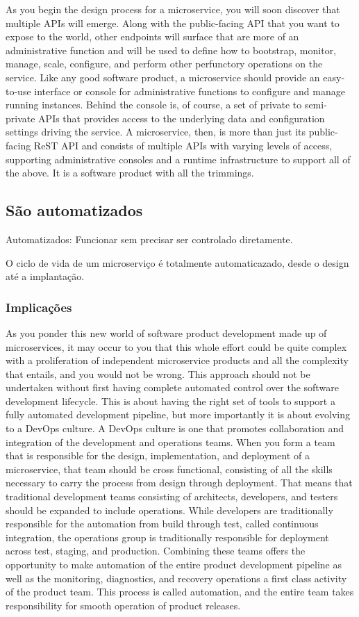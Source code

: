 As you begin the design process for a microservice, you will soon discover that multiple APIs will emerge. Along with the public-facing API that you want to expose to the world, other endpoints will surface that are more of an administrative function and will be used to define how to bootstrap, monitor, manage, scale, configure, and perform other perfunctory operations on the service. Like any good software product, a microservice should provide an easy-to-use interface or console for administrative functions to configure and manage running instances. Behind the console is, of course, a set of private to semi-private APIs that provides access to the underlying data and configuration settings driving the service. A microservice, then, is more than just its public-facing ReST API and consists of multiple APIs with varying levels of access, supporting administrative consoles and a runtime infrastructure to support all of the above. It is a software product with all the trimmings.

\subsection {São automatizados}

Automatizados: Funcionar sem precisar ser controlado diretamente.

O ciclo de vida de um microserviço é totalmente automaticazado, desde o design até a implantação.

\subsubsection*{Implicações}

As you ponder this new world of software product development made up of microservices, it may occur to you that this whole effort could be quite complex with a proliferation of independent microservice products and all the complexity that entails, and you would not be wrong. This approach should not be undertaken without first having complete automated control over the software development lifecycle. This is about having the right set of tools to support a fully automated development pipeline, but more importantly it is about evolving to a DevOps culture. A DevOps culture is one that promotes collaboration and integration of the development and operations teams. When you form a team that is responsible for the design, implementation, and deployment of a microservice, that team should be cross functional, consisting of all the skills necessary to carry the process from design through deployment. That means that traditional development teams consisting of architects, developers, and testers should be expanded to include operations. While developers are traditionally responsible for the automation from build through test, called continuous integration, the operations group is traditionally responsible for deployment across test, staging, and production. Combining these teams offers the opportunity to make automation of the entire product development pipeline as well as the monitoring, diagnostics, and recovery operations a first class activity of the product team. This process is called automation, and the entire team takes responsibility for smooth operation of product releases.

